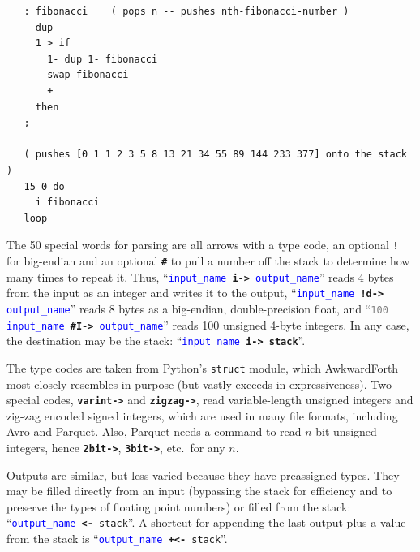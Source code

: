 \documentclass{webofc}
\begin{document}
\small
\begin{verbatim}
   : fibonacci    ( pops n -- pushes nth-fibonacci-number )
     dup
     1 > if
       1- dup 1- fibonacci
       swap fibonacci
       +
     then
   ;

   ( pushes [0 1 1 2 3 5 8 13 21 34 55 89 144 233 377] onto the stack )
   15 0 do
     i fibonacci
   loop
\end{verbatim}
\normalsize

The 50 special words for parsing are all arrows with a type code, an optional \textcolor{OliveGreen}{\tt\textbf{!}} for big-endian and an optional \textcolor{OliveGreen}{\tt\textbf{\#}} to pull a number off the stack to determine how many times to repeat it. Thus, ``{\tt \textcolor{blue}{input\_name} \textcolor{OliveGreen}{\textbf{i->}} \textcolor{blue}{output\_name}}'' reads 4 bytes from the input as an integer and writes it to the output, ``{\tt \textcolor{blue}{input\_name} \textcolor{OliveGreen}{\textbf{!d->}} \textcolor{blue}{output\_name}}'' reads 8 bytes as a big-endian, double-precision float, and ``{\tt \textcolor{gray}{100} \textcolor{blue}{input\_name} \textcolor{OliveGreen}{\textbf{\#I->}} \textcolor{blue}{output\_name}}'' reads 100 unsigned 4-byte integers. In any case, the destination may be the stack: ``{\tt \textcolor{blue}{input\_name} \textcolor{OliveGreen}{\textbf{i->}} \textcolor{OliveGreen}{\textbf{stack}}}''.

The type codes are taken from Python's \texttt{struct} module, which AwkwardForth most closely resembles in purpose (but vastly exceeds in expressiveness). Two special codes, \textcolor{OliveGreen}{\tt\textbf{varint->}} and \textcolor{OliveGreen}{\tt\textbf{zigzag->}}, read variable-length unsigned integers and zig-zag encoded signed integers, which are used in many file formats, including Avro and Parquet. Also, Parquet needs a command to read $n$-bit unsigned integers, hence \textcolor{OliveGreen}{\tt\textbf{2bit->}}, \textcolor{OliveGreen}{\tt\textbf{3bit->}}, etc.\ for any $n$.

Outputs are similar, but less varied because they have preassigned types. They may be filled directly from an input (bypassing the stack for efficiency and to preserve the types of floating point numbers) or filled from the stack: ``{\tt \textcolor{blue}{output\_name} \textcolor{OliveGreen}{\textbf{<-}} \textcolor{OliveGreen}{stack}}''. A shortcut for appending the last output plus a value from the stack is ``{\tt \textcolor{blue}{output\_name} \textcolor{OliveGreen}{\textbf{+<-}} \textcolor{OliveGreen}{stack}}''.
\end{document}
